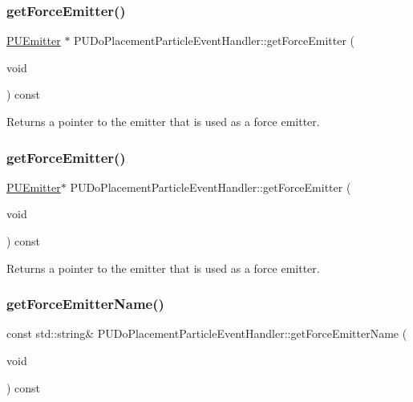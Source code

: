 \subsubsection{\texorpdfstring{get\+Force\+Emitter()}{getForceEmitter()}\hspace{0.1cm}{\footnotesize\ttfamily [1/2]}}
{\footnotesize\ttfamily \hyperlink{classPUEmitter}{P\+U\+Emitter} $\ast$ P\+U\+Do\+Placement\+Particle\+Event\+Handler\+::get\+Force\+Emitter (\begin{DoxyParamCaption}\item[{void}]{ }\end{DoxyParamCaption}) const}

Returns a pointer to the emitter that is used as a force emitter. \mbox{\label{classPUDoPlacementParticleEventHandler_a472cb20685ff513d1d599a339c933cde}} 
\subsubsection{\texorpdfstring{get\+Force\+Emitter()}{getForceEmitter()}\hspace{0.1cm}{\footnotesize\ttfamily [2/2]}}
{\footnotesize\ttfamily \hyperlink{classPUEmitter}{P\+U\+Emitter}$\ast$ P\+U\+Do\+Placement\+Particle\+Event\+Handler\+::get\+Force\+Emitter (\begin{DoxyParamCaption}\item[{void}]{ }\end{DoxyParamCaption}) const}

Returns a pointer to the emitter that is used as a force emitter. \mbox{\label{classPUDoPlacementParticleEventHandler_ab56e12fe41572adc447449f72a87b774}} 
\subsubsection{\texorpdfstring{get\+Force\+Emitter\+Name()}{getForceEmitterName()}\hspace{0.1cm}{\footnotesize\ttfamily [1/2]}}
{\footnotesize\ttfamily const std\+::string\& P\+U\+Do\+Placement\+Particle\+Event\+Handler\+::get\+Force\+Emitter\+Name (\begin{DoxyParamCaption}\item[{void}]{ }\end{DoxyParamCaption}) const\hspace{0.3cm}{\ttfamily [inline]}}

